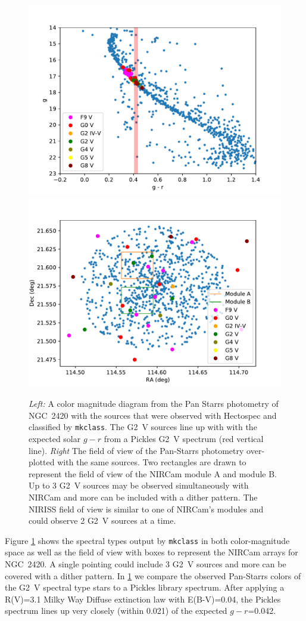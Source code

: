 \documentclass{aastex6}
\begin{document}
\begin{figure}[!hbtp]
\centering
\includegraphics[width=.49\columnwidth]{colormagNGC_2420.pdf}
\includegraphics[width=.49\columnwidth]{fovNGC_2420.pdf}
\caption{{\it Left:} A color magnitude diagram from the Pan Starrs photometry of NGC~2420 with the sources that were observed with Hectospec and classified by \texttt{mkclass}.
The G2~V sources line up with with the expected solar $g-r$ from a Pickles G2~V spectrum (red vertical line).
{\it Right} The field of view of the Pan-Starrs photometry over-plotted with the same sources.
Two rectangles are drawn to represent the field of view of the NIRCam module A and module B. Up to 3 G2~V sources may be observed simultaneously with NIRCam and more can be included with a dither pattern.
The NIRISS field of view is similar to one of NIRCam's modules and could observe 2 G2~V sources at a time. }\label{fig:ngc2420ClassCM}
\end{figure}

Figure \ref{fig:ngc2420ClassCM} shows the spectral types output by \texttt{mkclass} in both color-magnitude space as well as the field of view with boxes to represent the NIRCam arrays for NGC~2420.
A single pointing could include 3 G2~V sources and more can be covered with a dither pattern.
In \ref{fig:ngc2420ClassCM} we compare the observed Pan-Starrs colors of the G2~V spectral type stars to a Pickles library spectrum.
After applying a R(V)=3.1 \citet{cardelli1989} Milky Way Diffuse extinction law with E(B-V)=0.04, the Pickles spectrum lines up very closely (within 0.021) of the expected $g-r$=0.042.
\end{document}
